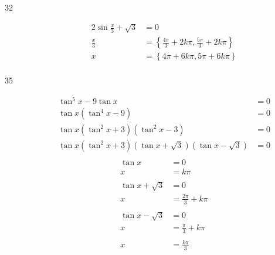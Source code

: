 \documentclass{exam}
\begin{document}
\begin{description}
      \item[32] 
        \begin{align*}
          2 \sin \frac{x}{3} + \sqrt{3} & = 0 \\
          \frac{x}{3}                   & = \left\{ \frac{4 \pi}{3} + 2k \pi, \frac{5 \pi}{3} + 2k \pi \right\} \\
          x                             & = \boxed{ \left\{ 4 \pi + 6k \pi, 5 \pi + 6k \pi \right\} } \\
        \end{align*}

      \pagebreak

      \item[35] 
        \begin{align*}
          \tan^5 x - 9 \tan x                                            & = 0 \\
          \tan x \left( \tan^4 x - 9 \right)                             & = 0 \\
          \tan x \left( \tan^2 x + 3 \right) \left( \tan^2 x - 3 \right) & = 0 \\
          \tan x \left( \tan^2 x + 3 \right) (\tan x + \sqrt{3}) (\tan x - \sqrt{3}) & = 0 \\
        \end{align*}
        \begin{align*}
          \tan x & = 0 \\
          x      & = k \pi \\
          \\
          \tan x + \sqrt{3} & = 0 \\
          x                 & = \frac{2 \pi}{3} + k \pi \\
          \\
          \tan x - \sqrt{3} & = 0 \\
          x                 & = \frac{\pi}{3} + k \pi \\
          \\
          x & = \boxed{ \frac{k \pi}{3} } \\
        \end{align*}


\end{description}
\end{document}
